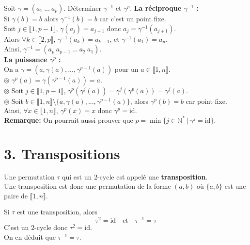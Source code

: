 \documentclass[11pt]{article}
\newcommand*{\N}{\mathbb{N}}
\newcommand*{\lb}{\llbracket}
\newcommand*{\rb}{\rrbracket}
\newcommand*{\id}{\text{id}}
\newcommand*{\n}{\\[0.2cm]}
\renewcommand*{\t}{\tau}
\newcommand{\0}{\varnothing}
\newcommand*{\g}{\gamma}
\begin{document}
\begin{ex}{}{}
    Soit $\g=(a_1~...~a_p)$. Déterminer $\g^{-1}$ et $\g^p$.
    \tcblower
    \textbf{La réciproque $\g^{-1}$ :}\\
    Si $\g(b)=b$ alors $\g^{-1}(b)=b$ car c'est un point fixe.\\
    Soit $j\in\lb1,p-1\rb$, $\g(a_j)=a_{j+1}$ donc $a_j=\g^{-1}(a_{j+1})$.\\
    Alors $\forall k \in \lb2,p\rb$, $\g^{-1}(a_k)=a_{k-1}$, et $\g^{-1}(a_1)=a_p$.\\
    Ainsi, $\g^{-1}=(a_p ~ a_{p-1} ~ ... ~ a_2 ~ a_1)$.\\[0.2cm]
    \textbf{La puissance $\g^p$ :}\\
    On a $\g=(a, \g(a), ..., \g^{p-1}(a))$ pour un $a\in\lb1,n\rb$.\\
    $\circledcirc$ $\g^p(a)=\g(\g^{p-1}(a))=a$.\\
    $\circledcirc$ Soit $j\in\lb1,p-1\rb$, $\g^p(\g^j(a))=\g^j(\g^p(a))=\g^j(a)$.\\
    $\circledcirc$ Soit $b\in\lb1,n\rb\setminus\{a,\g(a),...,\g^{p-1}(a)\}$, alors $\g^p(b)=b$ car point fixe.\\
    Ainsi, $\forall x \in \lb1,n\rb, ~ \g^p(x)=x$ donc $\g^p=\id$.\n
    \textbf{Remarque:} On pourrait aussi prouver que $p=\min\{j\in\N^*~|~\g^j=\id\}$.
\end{ex}
\section*{3. Transpositions}
\begin{defi}{}{}
    Une permutation $\t$ qui est un $2$-cycle est appelé une \textbf{transposition}.\\
    Une transposition est donc une permutation de la forme $(a,b)$ où $\{a,b\}$ est une paire de $\lb1,n\rb$.
\end{defi}

\begin{prop}{}{}
    Si $\t$ est une transposition, alors 
    \begin{equation*}
        \t^2=\id \quad \text{et} \quad \t^{-1}=\t
    \end{equation*}
    \tcblower
    C'est un $2$-cycle donc $\t^2=\id$.\\
    On en déduit que $\t^{-1}=\t$.
\end{prop}
\end{document}
